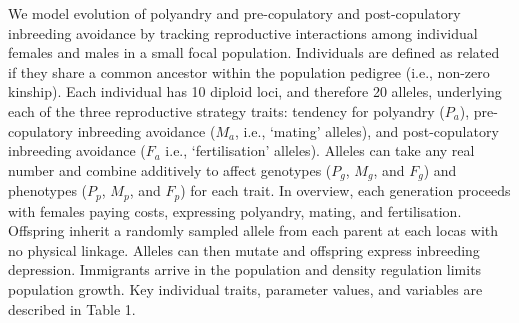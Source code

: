 \documentclass[10pt,letterpaper]{article}
\begin{document}
We model evolution of polyandry and pre-copulatory and post-copulatory inbreeding avoidance by tracking reproductive interactions among individual females and males in a small focal population. Individuals are defined as related if they share a common ancestor within the population pedigree (i.e., non-zero kinship). Each individual has 10 diploid loci, and therefore 20 alleles, underlying each of the three reproductive strategy traits: tendency for polyandry ($P_{a}$), pre-copulatory inbreeding avoidance ($M_{a}$, i.e., `mating' alleles), and post-copulatory inbreeding avoidance ($F_{a}$ i.e., `fertilisation' alleles). Alleles can take any real number \cite[i.e., a continuum-of-alleles model;][]{Kimura1965, Lande1976, Reeve2000, Bocedi2014} and combine additively to affect genotypes ($P_{g}$, $M_{g}$, and $F_{g}$) and phenotypes ($P_{p}$, $M_{p}$, and $F_{p}$) for each trait. In overview, each generation proceeds with females paying costs, expressing polyandry, mating, and fertilisation. Offspring inherit a randomly sampled allele from each parent at each locas with no physical linkage. Alleles can then mutate and offspring express inbreeding depression. Immigrants arrive in the population and density regulation limits population growth. Key individual traits, parameter values, and variables are described in Table 1.

\vspace{5 mm}
\end{document}
